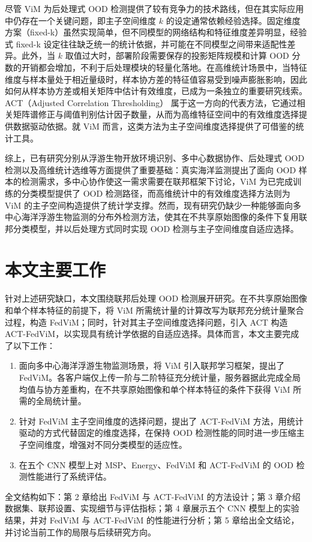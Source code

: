 尽管 ViM 为后处理式 OOD 检测提供了较有竞争力的技术路线，但在其实际应用中仍存在一个关键问题，即主子空间维度 $k$ 的设定通常依赖经验选择\cite{wang2022vim}。固定维度方案（fixed-k）虽然实现简单，但不同模型的网络结构和特征维度差异明显，经验式 fixed-k 设定往往缺乏统一的统计依据，并可能在不同模型之间带来适配性差异。此外，当 $k$ 取值过大时，部署阶段需要保存的投影矩阵规模和计算 OOD 分数的开销都会增加，不利于后处理模块的轻量化落地。在高维统计场景中，当特征维度与样本量处于相近量级时，样本协方差的特征值容易受到噪声膨胀影响，因此如何从样本协方差或相关矩阵中估计有效维度，已成为一条独立的重要研究线索。ACT（Adjusted Correlation Thresholding）\cite{fan2022act} 属于这一方向的代表方法，它通过相关矩阵谱修正与阈值判别估计因子数量，从而为高维特征空间中的有效维度选择提供数据驱动依据。就 ViM 而言，这类方法为主子空间维度选择提供了可借鉴的统计工具。

综上，已有研究分别从浮游生物开放环境识别、多中心数据协作、后处理式 OOD 检测以及高维统计选维等方面提供了重要基础：真实海洋监测提出了面向 OOD 样本的检测需求，多中心协作使这一需求需要在联邦框架下讨论，ViM 为已完成训练的分类模型提供了 OOD 检测路径，而高维统计中的有效维度选择方法则为 ViM 的主子空间构造提供了统计学支撑。然而，现有研究仍缺少一种能够面向多中心海洋浮游生物监测的分布外检测方法，使其在不共享原始图像的条件下复用联邦分类模型，并以后处理方式同时实现 OOD 检测与主子空间维度自适应选择。

\section{本文主要工作}

针对上述研究缺口，本文围绕联邦后处理 OOD 检测展开研究。在不共享原始图像和单个样本特征的前提下，将 ViM 所需统计量的计算改写为联邦充分统计量聚合过程，构造 FedViM；同时，针对其主子空间维度选择问题，引入 ACT 构造 ACT-FedViM，以实现具有统计学依据的自适应选择。具体而言，本文主要完成了以下工作：

\begin{enumerate}
  \item 面向多中心海洋浮游生物监测场景，将 ViM 引入联邦学习框架，提出了 FedViM。各客户端仅上传一阶与二阶特征充分统计量，服务器据此完成全局均值与协方差重构，在不共享原始图像和单个样本特征的条件下获得 ViM 所需的全局统计量。
  \item 针对 FedViM 主子空间维度的选择问题，提出了 ACT-FedViM 方法，用统计驱动的方式代替固定的维度选择，在保持 OOD 检测性能的同时进一步压缩主子空间维度，增强对不同分类模型的适应性。
  \item 在五个 CNN 模型上对 MSP、Energy、FedViM 和 ACT-FedViM 的 OOD 检测性能进行了系统评估。
\end{enumerate}

全文结构如下：第 2 章给出 FedViM 与 ACT-FedViM 的方法设计；第 3 章介绍数据集、联邦设置、实现细节与评估指标；第 4 章展示五个 CNN 模型上的实验结果，并对 FedViM 与 ACT-FedViM 的性能进行分析；第 5 章给出全文结论，并讨论当前工作的局限与后续研究方向。
